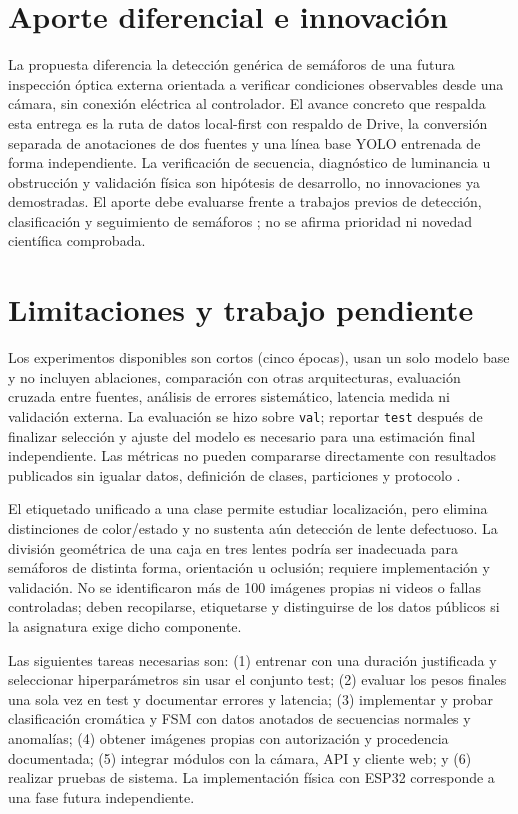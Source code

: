 \documentclass[conference]{IEEEtran}
\begin{document}
\section{Aporte diferencial e innovación}
La propuesta diferencia la detección genérica de semáforos de una futura inspección óptica externa orientada a verificar condiciones observables desde una cámara, sin conexión eléctrica al controlador. El avance concreto que respalda esta entrega es la ruta de datos local-first con respaldo de Drive, la conversión separada de anotaciones de dos fuentes y una línea base YOLO entrenada de forma independiente. La verificación de secuencia, diagnóstico de luminancia u obstrucción y validación física son hipótesis de desarrollo, no innovaciones ya demostradas. El aporte debe evaluarse frente a trabajos previos de detección, clasificación y seguimiento de semáforos \cite{jensen2016,behrendt2017,possatti2019,pavlitska2023}; no se afirma prioridad ni novedad científica comprobada.

\section{Limitaciones y trabajo pendiente}
Los experimentos disponibles son cortos (cinco épocas), usan un solo modelo base y no incluyen ablaciones, comparación con otras arquitecturas, evaluación cruzada entre fuentes, análisis de errores sistemático, latencia medida ni validación externa. La evaluación se hizo sobre \texttt{val}; reportar \texttt{test} después de finalizar selección y ajuste del modelo es necesario para una estimación final independiente. Las métricas no pueden compararse directamente con resultados publicados sin igualar datos, definición de clases, particiones y protocolo \cite{jensen2016,fernandez2018,pavlitska2023}.

El etiquetado unificado a una clase permite estudiar localización, pero elimina distinciones de color/estado y no sustenta aún detección de lente defectuoso. La división geométrica de una caja en tres lentes podría ser inadecuada para semáforos de distinta forma, orientación u oclusión; requiere implementación y validación. No se identificaron más de 100 imágenes propias ni videos o fallas controladas; deben recopilarse, etiquetarse y distinguirse de los datos públicos si la asignatura exige dicho componente.

Las siguientes tareas necesarias son: (1) entrenar con una duración justificada y seleccionar hiperparámetros sin usar el conjunto test; (2) evaluar los pesos finales una sola vez en test y documentar errores y latencia; (3) implementar y probar clasificación cromática y FSM con datos anotados de secuencias normales y anomalías; (4) obtener imágenes propias con autorización y procedencia documentada; (5) integrar módulos con la cámara, API y cliente web; y (6) realizar pruebas de sistema. La implementación física con ESP32 corresponde a una fase futura independiente.
\end{document}
